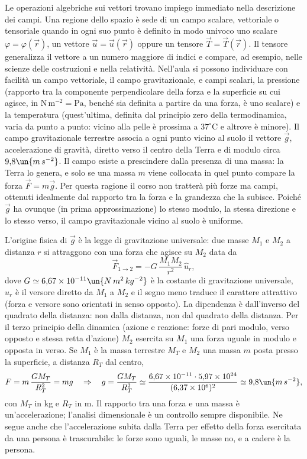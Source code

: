 \documentclass[main.tex]{subfiles}
\begin{document}
Le operazioni algebriche sui vettori trovano impiego immediato nella descrizione dei campi. Una regione dello spazio è sede di un campo scalare, vettoriale o tensoriale quando in ogni suo punto è definito in modo univoco uno scalare $\varphi=\varphi(\vec r)$, un vettore $\vec u=\vec u(\vec r)$ oppure un tensore $\vec T=\vec T(\vec r)$. Il tensore generalizza il vettore a un numero maggiore di indici e compare, ad esempio, nelle scienze delle costruzioni e nella relatività. Nell'aula si possono individuare con facilità un campo vettoriale, il campo gravitazionale, e campi scalari, la pressione (rapporto tra la componente perpendicolare della forza e la superficie su cui agisce, in $\mathrm{N\,m^{-2}}=\mathrm{Pa}$, benché sia definita a partire da una forza, è uno scalare) e la temperatura (quest'ultima, definita dal principio zero della termodinamica, varia da punto a punto: vicino alla pelle è prossima a $37^\circ\mathrm{C}$ e altrove è minore). Il campo gravitazionale terrestre associa a ogni punto vicino al suolo il vettore $\vec g$, accelerazione di gravità, diretto verso il centro della Terra e di modulo circa $9{,}8\un{m\,s^{-2}}$. Il campo esiste a prescindere dalla presenza di una massa: la Terra lo genera, e solo se una massa $m$ viene collocata in quel punto compare la forza $\vec F=m\vec g$. Per questa ragione il corso non tratterà più forze ma campi, ottenuti idealmente dal rapporto tra la forza e la grandezza che la subisce. Poiché $\vec g$ ha ovunque (in prima approssimazione) lo stesso modulo, la stessa direzione e lo stesso verso, il campo gravitazionale vicino al suolo è uniforme.

L'origine fisica di $\vec g$ è la legge di gravitazione universale: due masse $M_1$ e $M_2$ a distanza $r$ si attraggono con una forza che agisce su $M_2$ data da
\[
\vec F_{1\to2}=-G\,\frac{M_1M_2}{r^2}\,\hat u_r ,
\]
dove $G\simeq6{,}67\times10^{-11}\un{N\,m^2\,kg^{-2}}$ è la costante di gravitazione universale, $\hat u_r$ è il versore diretto da $M_1$ a $M_2$ e il segno meno traduce il carattere attrattivo (forza e versore sono orientati in senso opposto). La dipendenza è dall'inverso del quadrato della distanza: non dalla distanza, non dal quadrato della distanza. Per il terzo principio della dinamica (azione e reazione: forze di pari modulo, verso opposto e stessa retta d'azione) $M_2$ esercita su $M_1$ una forza uguale in modulo e opposta in verso. Se $M_1$ è la massa terrestre $M_T$ e $M_2$ una massa $m$ posta presso la superficie, a distanza $R_T$ dal centro,
\[
F=m\,\frac{GM_T}{R_T^2}=mg\quad\Rightarrow\quad g=\frac{GM_T}{R_T^2}\simeq\frac{6{,}67\times10^{-11}\cdot5{,}97\times10^{24}}{(6{,}37\times10^{6})^2}\simeq9{,}8\un{m\,s^{-2}} ,
\]
con $M_T$ in kg e $R_T$ in m. Il rapporto tra una forza e una massa è un'accelerazione; l'analisi dimensionale è un controllo sempre disponibile. Ne segue anche che l'accelerazione subita dalla Terra per effetto della forza esercitata da una persona è trascurabile: le forze sono uguali, le masse no, e a cadere è la persona.
\end{document}
